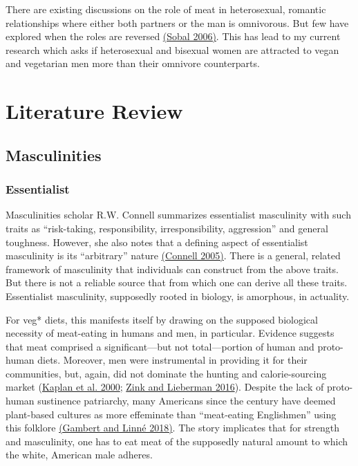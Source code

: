 \documentclass[twoside]{report}
\let\oldsection\section
\renewcommand\section{\clearpage\oldsection}
\begin{document}
There are existing discussions on the role of meat in heterosexual,
romantic relationships where either both partners or the man is
omnivorous. But few have explored when the roles are reversed \hyperlink{sobal}{(Sobal 2006)}. This has lead to my current research which asks if heterosexual and bisexual women are attracted to vegan and vegetarian men more than their omnivore counterparts.

\restoregeometry
\pagebreak

\pagestyle{fancy}
\fancyhf{}
\fancyfoot[LE,RO]{\thepage}

\twocolumn

\section{Literature Review}

\subsection{Masculinities}

\subsubsection{Essentialist}

Masculinities scholar R.W. Connell summarizes essentialist masculinity with such traits as ``risk-taking, responsibility, irresponsibility, aggression'' and general toughness. However, she also notes that a defining aspect of
essentialist masculinity is its ``arbitrary'' nature \hyperlink{connell}{(Connell 2005)}. There is a general, related framework of masculinity that individuals can construct from the above traits. But there is not a reliable source that from which one can derive all these traits. Essentialist masculinity, supposedly rooted in biology, is amorphous, in actuality.

For veg* diets, this manifests itself by drawing on the supposed
biological necessity of meat-eating in humans and men, in particular. Evidence suggests that meat comprised a significant---but not total---portion of human and proto-human diets. Moreover, men were instrumental in providing it for their communities, but, again, did not dominate the hunting and calorie-sourcing market (\hyperlink{kaplan}{Kaplan et al. 2000}; \hyperlink{zink}{Zink and Lieberman 2016}). Despite the lack of proto-human sustinence patriarchy, many Americans since the  century have deemed plant-based cultures as more effeminate than ``meat-eating Englishmen'' using this folklore \hyperlink{gambert}{(Gambert and Linné 2018)}. The story implicates that for strength and masculinity, one has to eat meat of the supposedly natural amount to which the white, American male adheres.
\end{document}
